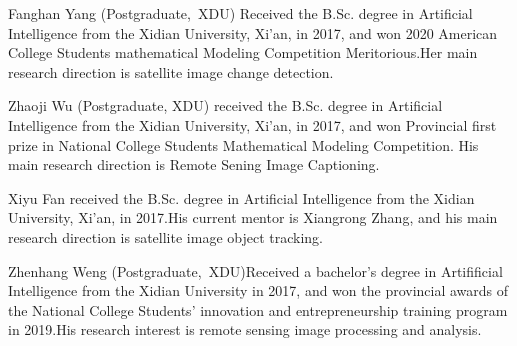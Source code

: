 \documentclass[journal]{IEEEtran}
\begin{document}




\begin{IEEEbiography}{Fanghan Yang}
(Postgraduate,~XDU) Received the B.Sc. degree in Artificial Intelligence from the Xidian University, Xi'an, in 2017, and won 2020 American College Students mathematical Modeling Competition Meritorious.Her main research direction is satellite image change detection.

\end{IEEEbiography}


 \begin{IEEEbiography}{Zhaoji Wu}
(Postgraduate, XDU) received the B.Sc. degree in Artificial Intelligence from the Xidian University, Xi'an, in 2017, and won Provincial first prize in  National College Students Mathematical Modeling Competition. His main research direction is Remote Sening Image Captioning.
\end{IEEEbiography}

  \begin{IEEEbiography}{Xiyu Fan}
	received the B.Sc. degree in Artificial Intelligence from the Xidian University, Xi’an, in 2017.His current mentor is Xiangrong Zhang, and his main research direction is satellite image object tracking.
 \end{IEEEbiography}

 \begin{IEEEbiography}{Zhenhang Weng}
(Postgraduate,~XDU)Received a bachelor's degree in Artifificial Intelligence from the Xidian University in 2017, and won the provincial awards of the National College Students' innovation and entrepreneurship training program in 2019.His research interest is remote sensing image processing and analysis.
\end{IEEEbiography}
\end{document}
